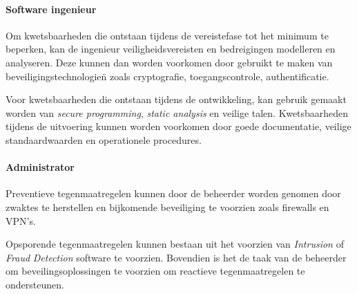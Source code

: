 \documentclass[../main.tex]{subfiles}
\begin{document}
\paragraph{Software ingenieur} 
Om kwetsbaarheden die ontstaan tijdens de vereistefase tot het minimum te beperken, kan de ingenieur veiligheidsvereisten en bedreigingen modelleren en analyseren. Deze kunnen dan worden voorkomen door gebruikt te maken van beveiligingstechnologie\"n zoals cryptografie, toegangscontrole, authentificatie.

Voor kwetsbaarheden die ontstaan tijdens de ontwikkeling, kan gebruik gemaakt worden van \textit{secure programming}, \textit{static analysis} en veilige talen. Kwetsbaarheden tijdens de uitvoering kunnen worden voorkomen door goede documentatie, veilige standaardwaarden en operationele procedures.

\paragraph{Administrator} 
Preventieve tegenmaatregelen kunnen door de beheerder worden genomen door zwaktes te herstellen en bijkomende beveiliging te voorzien zoals firewalls en VPN's. 

Opsporende tegenmaatregelen kunnen bestaan uit het voorzien van \textit{Intrusion} of \textit{Fraud} \textit{Detection} software te voorzien. Bovendien is het de taak van de beheerder om beveilingsoplossingen te voorzien om reactieve tegenmaatregelen te ondersteunen.
\end{document}
